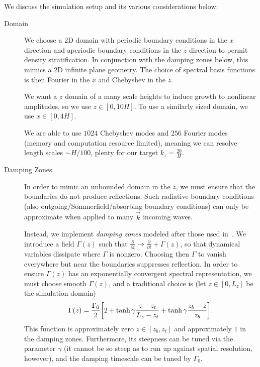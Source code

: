 \documentclass[11pt,
        usenames, %
        dvipsnames %
    ]{article}
\newcommand*{\pd}[2]{\frac{\partial#1}{\partial#2}}
\DeclarePairedDelimiter\s{\lbrack}{\rbrack}
\begin{document}
We discuss the simulation setup and its various considerations below:
\begin{description}
    \item[Domain] We choose a 2D domain with periodic boundary conditions in the
        $x$ direction and aperiodic boundary conditions in the $z$ direction to
        permit density stratification. In conjunction with the damping zones
        below, this mimics a 2D infinite plane geometry. The choice of spectral
        basis functions is then Fourier in the $x$ and Chebyshev in the $z$.

        We want a $z$ domain of a many scale heights to induce growth to
        nonlinear amplitudes, so we use $z \in [0, 10H]$. To use a similarly
        sized domain, we use $x \in [0, 4H]$.

        We are able to use $1024$ Chebyshev modes and $256$ Fourier modes
        (memory and computation resource limited), meaning we can resolve length
        scales $\sim H/100$, plenty for our target $k_z = \frac{20}{H}$.

    \item[Damping Zones] In order to mimic an unbounded domain in the $z$, we
        must ensure that the boundaries do not produce reflections. Such
        radiative boundary conditions (also outgoing/Sommerfield/absorbing
        boundary conditions) can only be approximate when applied to many
        $\vec{k}$ incoming waves\cite{RadBC}\cite{Wagatha1983}.

        Instead, we implement \emph{damping zones} modeled after those used
        in~\cite{LecoanetDamp}. We introduce a field $\Gamma(z)$ such that
        $\pd{}{t} \to \pd{}{t} + \Gamma(z)$, so that dynamical variables
        dissipate where $\Gamma$ is nonzero. Choosing then $\Gamma$ to vanish
        everywhere but near the boundaries suppresses reflection. In order to
        ensure $\Gamma(z)$ has an exponentially convergent spectral
        representation, we must choose smooth $\Gamma(z)$, and a traditional
        choice is (let $z \in [0, L_z]$ be the simulation domain)
        \begin{equation}
            \Gamma(z) = \frac{\Gamma_0}{2}\s*{
                2 + \tanh \gamma\frac{z - z_t}{L_z - z_t} +
                    \tanh \gamma\frac{z_b - z}{z_b}
            }.
        \end{equation}
        This function is approximately zero $z \in [z_b, z_t]$ and approximately
        $1$ in the damping zones. Furthermore, its steepness can be tuned via
        the parameter $\gamma$ (it cannot be so steep as to run up against
        spatial resolution, however), and the damping timescale can be tuned by
        $\Gamma_0$.


\end{description}
\end{document}
